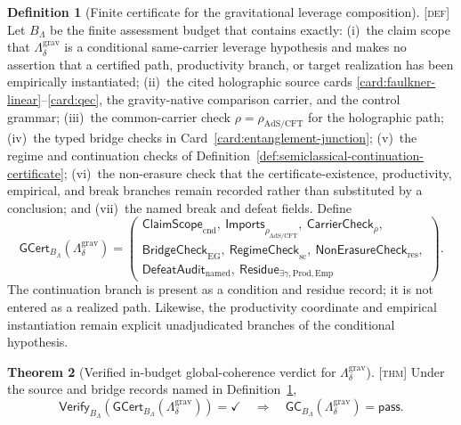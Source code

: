 \documentclass[11pt]{article}
\newcommand{\GCcert}{\ensuremath{\mathsf{GCert}}}
\newcommand{\GCverify}{\ensuremath{\mathsf{Verify}}}
\newcommand{\Defn}{\textsc{[def]}}
\newcommand{\Thm}{\textsc{[thm]}}
\theoremstyle{definition}
\newtheorem{sdefinition}{Definition}
\newtheorem{stheorem}[sdefinition]{Theorem}
\begin{document}
\begin{sdefinition}[Finite certificate for the gravitational leverage composition]
\label{def:gravitational-leverage-gcert}
\Defn{} Let $B_\Lambda$ be the finite assessment budget that contains exactly:
(i)~the claim scope that $\Lambda^{\mathrm{grav}}_\delta$ is a conditional
same-carrier leverage hypothesis and makes no assertion that a certified path,
productivity branch, or target realization has been empirically instantiated;
(ii)~the cited holographic source cards
\ref{card:faulkner-linear}--\ref{card:qec}, the gravity-native comparison carrier,
and the control grammar; (iii)~the common-carrier check
$\rho=\rho_{\mathrm{AdS/CFT}}$ for the holographic path; (iv)~the typed bridge
checks in Card~\ref{card:entanglement-junction}; (v)~the regime and continuation
checks of Definition~\ref{def:semiclassical-continuation-certificate};
(vi)~the non-erasure check that the certificate-existence, productivity, empirical,
and break branches remain recorded rather than substituted by a conclusion;
and (vii)~the named break and defeat fields. Define
\begin{equation}
\GCcert_{B_\Lambda}\!\left(\Lambda^{\mathrm{grav}}_\delta\right)=
\left(
\begin{array}{l}
\mathsf{ClaimScope}_{\mathrm{cnd}},\ 
\mathsf{Imports}_{\rho_{\mathrm{AdS/CFT}}},\ 
\mathsf{CarrierCheck}_{\rho},\\
\mathsf{BridgeCheck}_{\mathrm{EG}},\ 
\mathsf{RegimeCheck}_{\mathrm{sc}},\ 
\mathsf{NonErasureCheck}_{\mathrm{res}},\\
\mathsf{DefeatAudit}_{\mathrm{named}},\ 
\mathsf{Residue}_{\exists\gamma,\mathrm{Prod},\mathrm{Emp}}
\end{array}
\right).
\label{eq:gravitational-leverage-gcert}
\end{equation}
The continuation branch is present as a condition and residue record; it is not
entered as a realized path. Likewise, the productivity coordinate and empirical
instantiation remain explicit unadjudicated branches of the conditional hypothesis.
\end{sdefinition}

\begin{stheorem}[Verified in-budget global-coherence verdict for $\Lambda^{\mathrm{grav}}_\delta$]
\label{thm:verify-gravitational-leverage-gcert}
\Thm{} Under the source and bridge records named in
Definition~\ref{def:gravitational-leverage-gcert},
\begin{equation}
\GCverify_{B_\Lambda}\!\left(
\GCcert_{B_\Lambda}\!\left(\Lambda^{\mathrm{grav}}_\delta\right)
\right)=\checkmark
\quad\Longrightarrow\quad
\mathsf{GC}_{B_\Lambda}\!\left(\Lambda^{\mathrm{grav}}_\delta\right)=\mathsf{pass}.
\label{eq:leverage-gc-pass}
\end{equation}
\end{stheorem}
\end{document}
